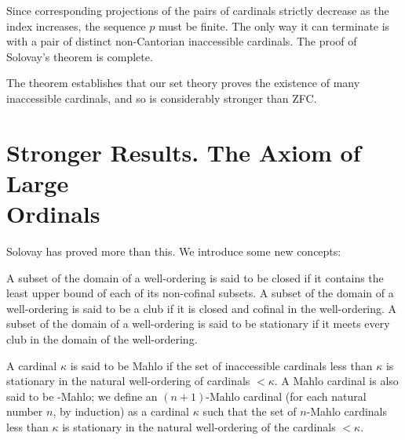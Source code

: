 Since corresponding projections of the pairs of
cardinals strictly decrease as the index
increases, the sequence $p$ must be finite.  The only way it
can terminate is with a pair of distinct non-Cantorian inaccessible cardinals.  The proof of Solovay's theorem is complete.
\finpreuve

The theorem establishes that our set theory proves the existence of
many inaccessible cardinals, and so is considerably stronger than
ZFC.



\section[Stronger Results]{Stronger Results. The Axiom of Large\\ Ordinals}

Solovay has proved more than this.  We introduce some new concepts:

\begin{definition}
 A subset
 of the domain of a well-ordering is said 
 to be {\upshape closed} if it contains the least upper bound of each of its non-cofinal subsets.  A subset of the domain of a
 well-ordering is said to be a {\upshape club} if it is closed and
 cofinal in the well-ordering.  A subset of the domain of a well-ordering is
 said to be {\upshape stationary} if it meets every club
 in the domain of the well-ordering.
\end{definition}

\begin{definition}
 A cardinal $\kappa$ is said to be {\upshape Mahlo} if
 the set of inaccessible cardinals less than
 $\kappa$ is stationary in the 
 natural well-ordering of cardinals $< \kappa$.  A Mahlo
 cardinal is also said to be {-Mahlo}; we
 define an {\upshape $(n+1)$-Mahlo 
 cardinal} (for each natural number $n$, by induction) as
 a cardinal $\kappa$ such that the set of $n$-Mahlo cardinals less than
 $\kappa$ is stationary in the natural well-ordering of the cardinals $<
 \kappa$.
\end{definition}

